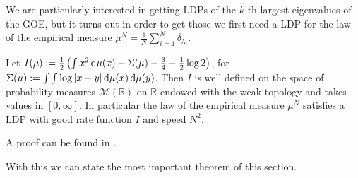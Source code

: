 
We are particularly interested in getting LDPs of the $k$-th largest eigenvalues of the GOE, but it turns out in order to get those we first need a LDP for the law of the empirical measure $\mu^N=\frac{1}{N}\sum_{i=1}^N\delta_{\lambda_i}$.

\begin{theorem}\label{thm:LDPforWSCL}
	Let $I(\mu):=\frac{1}{2}\left(\int x^2\mathop{}\!\mathrm{d}\mu(x) - \Sigma(\mu) - \frac{3}{4}-\frac{1}{2}\log 2 \right)$, for $\Sigma(\mu):=\int\int\log|x-y|\mathop{}\!\mathrm{d}\mu(x)\mathop{}\!\mathrm{d}\mu(y)$. Then $I$ is well defined on the space of probability measures $\mathcal M(\mathbb{R})$ on $\mathbb{R}$ endowed with the weak topology and takes values in $[0,\infty]$.
	In particular the law of the empirical measure $\mu^N$ satisfies a LDP with good rate function $I$ and speed $N^2$.
\end{theorem}

A proof can be found in \cite{ArousLDPforWSL}.

With this we can state the most important theorem of this section.

